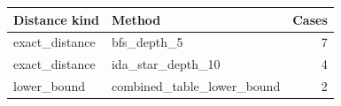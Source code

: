 \begin{tabular}{p{}p{}r}
\hline
Distance kind & Method & Cases \\
\hline
exact\_distance & bfs\_depth\_5 & 7 \\
exact\_distance & ida\_star\_depth\_10 & 4 \\
lower\_bound & combined\_table\_lower\_bound & 2 \\
\hline
\end{tabular}
